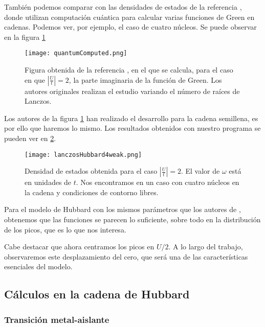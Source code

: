 \documentclass[12pt,twoside]{article}
\begin{document}
También podemos comparar con las densidades de estados de la referencia \cite{GreeneDiniz2024}, donde utilizan computación cuántica para calcular varias funciones de Green en cadenas. Podemos ver, por ejemplo, el caso de cuatro núcleos. Se puede observar en la figura \ref{fig:quantumLanczosHubbard}
\begin{figure}[h!]
  \begin{center}
    \texttt{[image: quantumComputed.png]}
  \end{center}
  \caption{Figura obtenida de la referencia \cite{GreeneDiniz2024}, en el que se calcula, para el caso en que $\left|\frac{U}{t}\right| = 2$, la parte imaginaria de la función de Green. Los autores originales realizan el estudio variando el número de raíces de Lanczos.}
  \label{fig:quantumLanczosHubbard}
\end{figure}

Los autores de la figura \ref{fig:quantumLanczosHubbard} han realizado el desarrollo para la cadena semillena, es por ello que haremos lo mismo. Los resultados obtenidos con nuestro programa se pueden ver en \ref{fig:lanczosHubbard4}.
\begin{figure}[h!]
  \begin{center}
    \texttt{[image: lanczosHubbard4weak.png]}
  \end{center}
  \caption{Densidad de estados obtenida para el caso $\left|\frac{U}{t}\right| = 2$. El valor de $\omega$ está en unidades de $t$. Nos encontramos en un caso con cuatro núcleos en la cadena y condiciones de contorno libres.}
  \label{fig:lanczosHubbard4}
\end{figure}

Para el modelo de Hubbard con los mismos parámetros que los autores de \cite{GreeneDiniz2024}, obtenemos que las funciones se parecen lo suficiente, sobre todo en la distribución de los picos, que es lo que nos interesa.

Cabe destacar que ahora centramos los picos en $U/2$. A lo largo del trabajo, observaremos este desplazamiento del cero, que será una de las características esenciales del modelo.
\subsection{Cálculos en la cadena de Hubbard}
\subsubsection{Transición metal-aislante}
\end{document}
